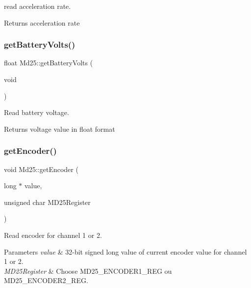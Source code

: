 read acceleration rate. 

\begin{DoxyReturn}{Returns}
acceleration rate 
\end{DoxyReturn}
\mbox{\label{classMd25_aab64f06aef0d5e0214772c519eb6a2e8}} 
\subsubsection{\texorpdfstring{get\+Battery\+Volts()}{getBatteryVolts()}}
{\footnotesize\ttfamily float Md25\+::get\+Battery\+Volts (\begin{DoxyParamCaption}\item[{void}]{ }\end{DoxyParamCaption})}



Read battery voltage. 

\begin{DoxyReturn}{Returns}
voltage value in float format 
\end{DoxyReturn}
\mbox{\label{classMd25_a1bb2bac91e24a008856f5b3b7909fbf8}} 
\subsubsection{\texorpdfstring{get\+Encoder()}{getEncoder()}}
{\footnotesize\ttfamily void Md25\+::get\+Encoder (\begin{DoxyParamCaption}\item[{long $\ast$}]{value,  }\item[{unsigned char}]{M\+D25\+Register }\end{DoxyParamCaption})}



Read encoder for channel 1 or 2. 


\begin{DoxyParams}{Parameters}
{\em value} & 32-\/bit signed long value of current encoder value for channel 1 or 2. \\
\hline
{\em M\+D25\+Register} & Choose M\+D25\+\_\+\+E\+N\+C\+O\+D\+E\+R1\+\_\+\+R\+EG ou M\+D25\+\_\+\+E\+N\+C\+O\+D\+E\+R2\+\_\+\+R\+EG. \\
\hline
\end{DoxyParams}
\mbox{\label{classMd25_a8bd5ce341e890968e63be0f8809d9f5b}} 
